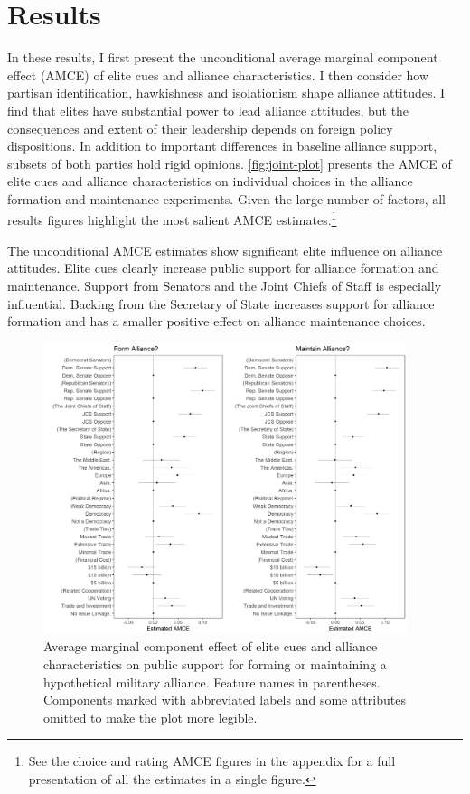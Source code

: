 \documentclass[12pt]{article}
\begin{document}
\section{Results} 


In these results, I first present the unconditional average marginal component effect (AMCE) of elite cues and alliance characteristics.
I then consider how partisan identification, hawkishness and isolationism shape alliance attitudes. 
I find that elites have substantial power to lead alliance attitudes, but the consequences and extent of their leadership depends on foreign policy dispositions.
In addition to important differences in baseline alliance support, subsets of both parties hold rigid opinions. 
\autoref{fig:joint-plot} presents the AMCE of elite cues and alliance characteristics on individual choices in the alliance formation and maintenance experiments.
Given the large number of factors, all results figures highlight the most salient AMCE estimates.\footnote{See the choice and rating AMCE figures in the appendix for a full presentation of all the estimates in a single figure.}


The unconditional AMCE estimates show significant elite influence on alliance attitudes. 
Elite cues clearly increase public support for alliance formation and maintenance. 
Support from Senators and the Joint Chiefs of Staff is especially influential.
Backing from the Secretary of State increases support for alliance formation and has a smaller positive effect on alliance maintenance choices. 


\begin{figure}
	\centering
		\includegraphics[width=0.95\textwidth]{../figures/joint-amce-plots.png}
	\caption{Average marginal component effect of elite cues and alliance characteristics on public support for forming or maintaining a hypothetical military alliance. Feature names in parentheses. Components marked with abbreviated labels and some attributes omitted to make the plot more legible.}
	\label{fig:joint-plot}
\end{figure}
\end{document}

